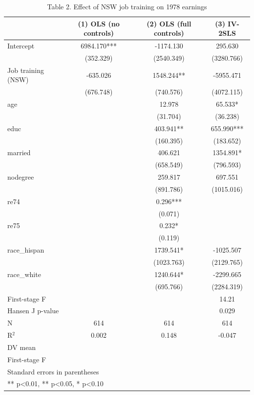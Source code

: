 \begin{table}[htbp]
\centering
\caption{Table 2. Effect of NSW job training on 1978 earnings}
\begin{tabular}{lccc}
\toprule
 & (1) OLS (no controls) & (2) OLS (full controls) & (3) IV-2SLS \\
\midrule
Intercept & 6984.170*** & -1174.130 & 295.630 \\
 & (352.329) & (2540.349) & (3280.766) \\
Job training (NSW) & -635.026 & 1548.244** & -5955.471 \\
 & (676.748) & (740.576) & (4072.115) \\
age &  & 12.978 & 65.533* \\
 &  & (31.704) & (36.238) \\
educ &  & 403.941** & 655.990*** \\
 &  & (160.395) & (183.652) \\
married &  & 406.621 & 1354.891* \\
 &  & (658.549) & (796.593) \\
nodegree &  & 259.817 & 697.551 \\
 &  & (891.786) & (1015.016) \\
re74 &  & 0.296*** &  \\
 &  & (0.071) &  \\
re75 &  & 0.232* &  \\
 &  & (0.119) &  \\
race\_hispan &  & 1739.541* & -1025.507 \\
 &  & (1023.763) & (2129.765) \\
race\_white &  & 1240.644* & -2299.665 \\
 &  & (695.766) & (2284.319) \\
\midrule
First-stage F &  &  & 14.21 \\
Hansen J p-value &  &  & 0.029 \\
\midrule
N & 614 & 614 & 614 \\
R$^2$ & 0.002 & 0.148 & -0.047 \\
DV mean &  &  &  \\
First-stage F &  &  &  \\
\bottomrule
\multicolumn{4}{l}{\footnotesize Standard errors in parentheses} \\
\multicolumn{4}{l}{\footnotesize *** p<0.01, ** p<0.05, * p<0.10} \\
\end{tabular}
\end{table}